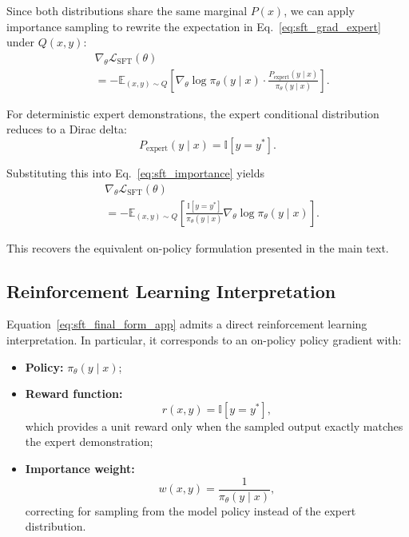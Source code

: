 Since both distributions share the same marginal \(P(x)\), we can apply importance sampling to rewrite the expectation in Eq.~\eqref{eq:sft_grad_expert} under \(Q(x,y)\):
\begin{equation}
\begin{aligned}
&\nabla_\theta \mathcal{L}_{\mathrm{SFT}}(\theta)\\
&=
-
\mathbb{E}_{(x,y) \sim Q}
\left[
\nabla_\theta \log \pi_\theta(y \mid x)
\cdot
\frac{P_{\mathrm{expert}}(y \mid x)}{\pi_\theta(y \mid x)}
\right].
\end{aligned}
\label{eq:sft_importance}
\end{equation}

For deterministic expert demonstrations, the expert conditional distribution reduces to a Dirac delta:
\begin{equation}
P_{\mathrm{expert}}(y \mid x) = \mathbb{I}[y = y^*].
\end{equation}

Substituting this into Eq.~\eqref{eq:sft_importance} yields
\begin{equation}
\begin{aligned}
&\nabla_\theta \mathcal{L}_{\mathrm{SFT}}(\theta)\\
&=
-
\mathbb{E}_{(x,y) \sim Q}
\left[
\frac{\mathbb{I}[y = y^*]}{\pi_\theta(y \mid x)}
\nabla_\theta \log \pi_\theta(y \mid x)
\right].
\end{aligned}
\label{eq:sft_final_form_app}
\end{equation}

This recovers the equivalent on-policy formulation presented in the main text.

\subsection{Reinforcement Learning Interpretation}

Equation~\eqref{eq:sft_final_form_app} admits a direct reinforcement learning interpretation. In particular, it corresponds to an on-policy policy gradient with:
\begin{itemize}
    \item \textbf{Policy:} \(\pi_\theta(y \mid x)\);
    \item \textbf{Reward function:}
    \begin{equation}
    r(x,y) = \mathbb{I}[y = y^*],
    \end{equation}
    which provides a unit reward only when the sampled output exactly matches the expert demonstration;
    \item \textbf{Importance weight:}
    \begin{equation}
    w(x,y) = \frac{1}{\pi_\theta(y \mid x)},
    \end{equation}
    correcting for sampling from the model policy instead of the expert distribution.
\end{itemize}

